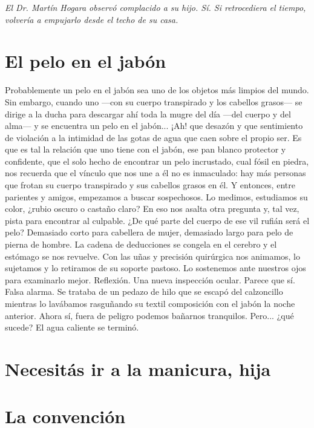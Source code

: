 \documentclass[11pt,twoside,openright,a6paper]{book}
\begin{document}
\emph{El Dr. Martín Hogara observó complacido a su hijo. Sí. Si retrocediera el tiempo, volvería a empujarlo desde el techo de su casa.}

\chapter*{El pelo en el jabón}

Probablemente un pelo en el jabón sea uno de los objetos más limpios del mundo. Sin embargo, cuando uno —con su cuerpo transpirado y los cabellos grasos— se dirige a la ducha para descargar ahí toda la mugre del día —del cuerpo y del alma— y se encuentra un pelo en el jabón... ¡Ah! que desazón y que sentimiento de violación a la intimidad de las gotas de agua que caen sobre el propio ser. Es que es tal la relación que uno tiene con el jabón, ese pan blanco protector y confidente, que el solo hecho de encontrar un pelo incrustado, cual fósil en piedra, nos recuerda que el vínculo que nos une a él no es inmaculado: hay más personas que frotan su cuerpo transpirado y sus cabellos grasos en él. Y entonces, entre parientes y amigos, empezamos a buscar sospechosos. Lo medimos, estudiamos su color, ¿rubio oscuro o castaño claro? En eso nos asalta otra pregunta y, tal vez, pista para encontrar al culpable. ¿De qué parte del cuerpo de ese vil rufián será el pelo? Demasiado corto para cabellera de mujer, demasiado largo para pelo de pierna de hombre. La cadena de deducciones se congela en el cerebro y el estómago se nos revuelve. Con las uñas y precisión quirúrgica nos animamos, lo sujetamos y lo retiramos de su soporte pastoso. Lo sostenemos ante nuestros ojos para examinarlo mejor. Reflexión. Una nueva inspección ocular. Parece que sí. Falsa alarma. Se trataba de un pedazo de hilo que se escapó del calzoncillo mientras lo lavábamos rasguñando su textil composición con el jabón la noche anterior. Ahora sí, fuera de peligro podemos bañarnos tranquilos. Pero... ¿qué sucede? El agua caliente se terminó.

\chapter*{Necesitás ir a la manicura, hija}

\chapter*{La convención}
\end{document}

